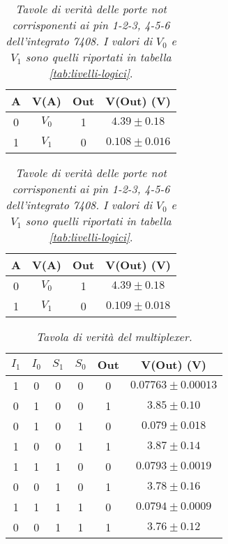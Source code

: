\begin{table}[H]
  \centering
  \begin{subtable}
    \centering
    \begin{tabular}[t]{c  c | c  c }
      \hline
      A & V(A) & Out & V(Out) (V) \\
      \hline
      0 & $V_{0}$ & 1 & $4.39 \pm 0.18$ \\
      1& $V_{1}$ & 0 & $0.108 \pm 0.016$ \\
      \hline
    \end{tabular}
  \end{subtable}
  \vspace{.5mm}
  \begin{subtable}
    \centering
    \begin{tabular}[t]{c  c | c  c }
      \hline
      A & V(A) & Out & V(Out) (V) \\
      \hline
      0 & $V_{0}$ & 1 & $4.39 \pm 0.18$ \\
      1& $V_{1}$ & 0 & $0.109 \pm 0.018$ \\
      \hline
    \end{tabular}
  \end{subtable}
  \caption{\emph{Tavole di verità delle porte \emph{not} corrisponenti ai pin 1-2-3, 4-5-6 dell'integrato 7408. I valori di $V_{0}$ e $V_{1}$ sono quelli riportati in tabella \ref{tab:livelli-logici}}.}
  \label{tab:not-multiplexer}
\end{table}

\begin{table}[H]
  \centering
  \begin{tabular}{c c | c c | c c }
    \hline
    $I_{1}$ & $I_{0}$ & $S_{1}$ & $S_{0}$ & Out & V(Out) (V) \\
    \hline
    1 & 0 & 0 & 0 & 0 & $0.07763 \pm 0.00013$ \\
    0 & 1 & 0 & 0 & 1 & $3.85 \pm 0.10$ \\
    0 & 1 & 0 & 1 & 0 & $0.079 \pm 0.018$ \\
    1 & 0 & 0 & 1 & 1 & $3.87 \pm 0.14$ \\
    1 & 1 & 1 & 0 & 0 & $0.0793 \pm 0.0019$ \\
    0 & 0 & 1 & 0 & 1 & $3.78 \pm 0.16$ \\
    1 & 1 & 1 & 1 & 0 & $0.0794 \pm 0.0009$ \\
    0 & 0 & 1 & 1 & 1 & $3.76 \pm 0.12$ \\
  \end{tabular}
  \caption{\emph{Tavola di verità del multiplexer.}}
  \label{tab:multiplexer}
\end{table}
